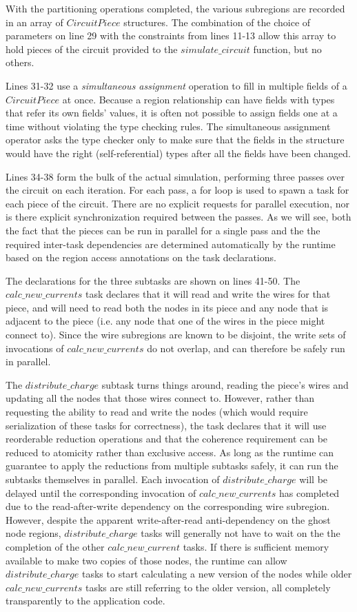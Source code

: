 With the partitioning operations completed, the various subregions are
recorded in an array of $CircuitPiece$ structures.  The combination of the
choice of parameters on line 29 with the constraints from lines 11-13 allow 
this array to hold pieces of the circuit provided to the $simulate\_circuit$
function, but no others.

Lines 31-32 use a \emph{simultaneous assignment} operation to fill in multiple
fields of a $CircuitPiece$ at once.  Because a region relationship can have
fields with types that refer its own fields' values, it is often not possible
to assign fields one at a time without violating the type checking rules.
The simultaneous assignment operator asks the type checker only to make sure
that the fields in the structure would have the right (self-referential) types
after all the fields have been changed.

Lines 34-38 form the bulk of the actual simulation, performing three passes
over the circuit on each iteration.  For each pass, a for loop is used to 
spawn a task for each piece of the circuit.  There are no explicit requests for
parallel execution, nor is there explicit synchronization required between the
passes.  As we will see, both the fact that the pieces can be run in parallel
for a single 
pass and the the required inter-task dependencies are determined automatically
by the runtime based on the region access annotations on the task declarations.

The declarations for the three subtasks are shown on lines 41-50.  The 
$calc\_new\_currents$ task declares that it will read and write the wires
for that piece, and will need to read both the nodes in its piece and any
node that is adjacent to the piece (i.e. any node that one of the wires in the
piece might connect to).  Since the wire subregions are known to be disjoint,
the write sets of invocations of $calc\_new\_currents$ do not overlap, and can
therefore be safely run in parallel.

The $distribute\_charge$ subtask turns things around, reading the piece's 
wires and updating all the nodes that those wires connect to.  However,
rather than requesting the ability to read and write the nodes (which would
require serialization of these tasks for correctness), the task declares that
it will use reorderable reduction operations and that the coherence requirement
can be reduced to atomicity rather than exclusive access.  As long as the
runtime can guarantee to apply the reductions from multiple subtasks safely, it
can run the subtasks themselves in parallel.  Each invocation of 
$distribute\_charge$ will be delayed until the corresponding invocation of 
$calc\_new\_currents$ has completed due to the read-after-write dependency on
the corresponding wire subregion.  However, despite the apparent 
write-after-read anti-dependency on the ghost node regions, $distribute\_charge$
tasks will generally not have to wait on the the completion of the other
$calc\_new\_current$ tasks.  If there is sufficient memory available to make
two copies of those nodes, the runtime can allow $distribute\_charge$ tasks to
start calculating a new version of the nodes while older $calc\_new\_currents$
tasks are still referring to the older version, all completely transparently to
the application code.

